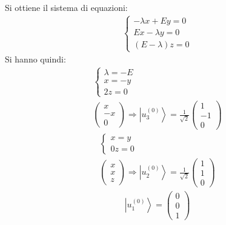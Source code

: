 
Si ottiene il sistema di equazioni:
\begin{equation}\begin{split}
\begin{cases}
-\lambda x+Ey=0\\
Ex -\lambda y=0\\
\left(E-\lambda\right)z=0
\end{cases}
\end{split}\end{equation}
Si hanno quindi:
\begin{equation}\begin{split}
\begin{cases}
\lambda=-E\\
x=-y\\
2z=0
\end{cases}\\
\left(\begin{matrix}x\\-x\\0\end{matrix}\right) \Longrightarrow \left |u_3^{\left(0\right)} \right\rangle=\frac{1}{\sqrt{2}}\left(\begin{matrix}1\\-1\\0\end{matrix}\right)
\end{split}\end{equation}
\begin{equation}\begin{split}
\begin{cases}
x=y\\
0z=0
\end{cases}\\
\left(\begin{matrix}x\\x\\z\end{matrix}\right) \Longrightarrow \left |u_2^{\left(0\right)} \right\rangle=\frac{1}{\sqrt{2}}\left(\begin{matrix}1\\1\\0\end{matrix}\right) 
\end{split}\end{equation}
\begin{equation}\begin{split}
\left |u_1^{\left(0\right)} \right\rangle=\left(\begin{matrix}0\\0\\1\end{matrix}\right)
\end{split}\end{equation}

